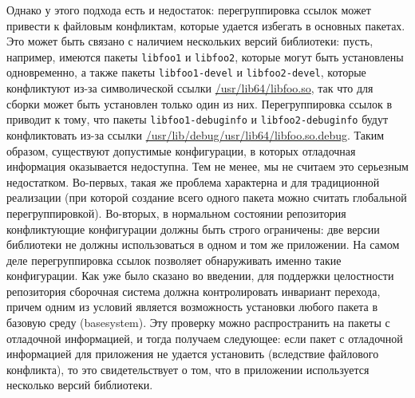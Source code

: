 \documentclass[russian,a4paper,12pt,titlepage]{article}
\begin{document}
Однако у этого подхода есть и недостаток: перегруппировка ссылок может привести к файловым конфликтам,
которые удается избегать в основных пакетах.  Это может быть связано с наличием нескольких версий библиотеки:
пусть, например, имеются пакеты \verb|libfoo1| и \verb|libfoo2|, которые могут быть установлены одновременно,
а также пакеты \verb|libfoo1-devel| и \verb|libfoo2-devel|, которые конфликтуют из-за символической ссылки
\url{/usr/lib64/libfoo.so}, так что для сборки может быть установлен только один из них.  Перегруппировка
ссылок в приводит к тому, что пакеты \verb|libfoo1-debuginfo| и \verb|libfoo2-debuginfo| будут конфликтовать
из-за ссылки \url{/usr/lib/debug/usr/lib64/libfoo.so.debug}.  Таким образом, существуют допустимые конфигурации,
в которых отладочная информация оказывается недоступна.  Тем не менее, мы не считаем это серьезным недостатком.
Во-первых, такая же проблема характерна и для традиционной реализации (при которой создание всего одного пакета
можно считать глобальной перегруппировкой).  Во-вторых, в нормальном состоянии репозитория конфликтующие конфигурации
должны быть строго ограничены: две версии библиотеки не должны использоваться в одном и том же приложении.
На самом деле перегруппировка ссылок позволяет обнаруживать именно такие конфигурации.  Как уже было сказано во введении,
для поддержки целостности репозитория сборочная система должна контролировать инвариант перехода, причем одним
из условий является возможность установки любого пакета в базовую среду (basesystem).  Эту проверку можно распространить
на пакеты с отладочной информацией, и тогда получаем следующее: если пакет с отладочной информацией для приложения не удается
установить (вследствие файлового конфликта), то это свидетельствует о том, что в приложении используется несколько
версий библиотеки.
\end{document}
